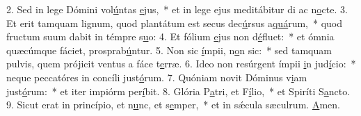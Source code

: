 2. Sed in lege Dómini vol\uline{ú}ntas \uline{e}jus,~* et in lege ejus meditábitur di ac n\uline{o}cte.
3. Et erit tamquam lignum, quod plantátum est secus dec\uline{ú}rsus a\uline{quá}rum,~* quod fructum suum dabit in témpre s\uline{u}o:
4. Et fólium \uline{e}jus non d\uline{é}fluet:~* et ómnia quæcúmque fáciet, prosprab\uline{ú}ntur.
5. Non sic \uline{í}mpii, n\uline{o}n sic:~* sed tamquam pulvis, quem prójicit ventus a fáce t\uline{e}rræ.
6. Ideo non resúrgent ímpii \uline{i}n jud\uline{í}cio:~* neque peccatóres in concíli just\uline{ó}rum.
7. Quóniam novit Dóminus v\uline{i}am just\uline{ó}rum:~* et iter impiórm per\uline{í}bit.
8. Glória P\uline{a}tri, et F\uline{í}lio,~* et Spiríti S\uline{a}ncto.
9. Sicut erat in princípio, et n\uline{u}nc, et s\uline{e}mper,~* et in sǽcula sæculrum. \uline{A}men.
